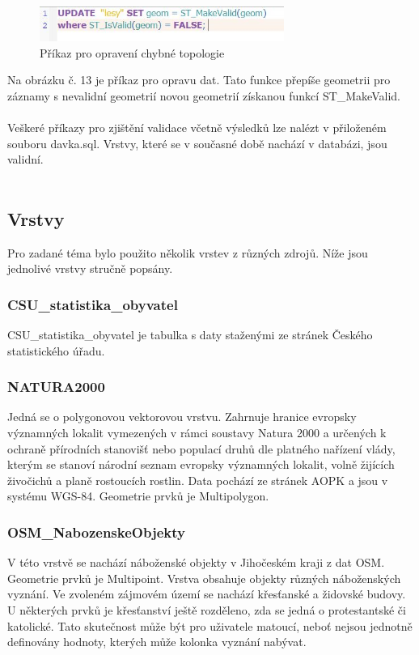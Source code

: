 \documentclass[a4paper, 12pt]{article}
\begin{document}
\begin{figure}[h!]
	\centering
	\includegraphics[width=8cm]{pictures/oprava_val.jpg}
	\caption{Příkaz pro opravení chybné topologie}
\end{figure}

Na obrázku č. 13 je příkaz pro opravu dat. Tato funkce přepíše geometrii pro záznamy s nevalidní geometrií novou geometrií získanou funkcí ST\_MakeValid.\\
\\

Veškeré příkazy pro zjištění validace včetně výsledků lze nalézt v přiloženém souboru davka.sql. Vrstvy, které se v současné době nachází v databázi, jsou validní.\\
\\
\clearpage
\subsection{Vrstvy}
Pro zadané téma bylo použito několik vrstev z různých zdrojů. Níže jsou jednolivé vrstvy stručně popsány.

\subsubsection{CSU\_statistika\_obyvatel}
CSU\_statistika\_obyvatel je tabulka s daty staženými ze stránek Českého statistického úřadu. 

\subsubsection{NATURA2000}
Jedná se o polygonovou vektorovou vrstvu. Zahrnuje hranice evropsky významných lokalit vymezených v rámci soustavy Natura 2000 a určených k ochraně přírodních stanovišť nebo populací druhů dle platného nařízení vlády, kterým se stanoví národní seznam evropsky významných lokalit, volně žijících živočichů a planě rostoucích rostlin. Data pochází ze stránek AOPK a jsou v systému WGS-84. Geometrie prvků je Multipolygon.

\subsubsection{OSM\_NabozenskeObjekty}
V této vrstvě se nachází náboženské objekty v Jihočeském kraji z dat OSM. Geometrie prvků je Multipoint. Vrstva obsahuje objekty různých náboženských vyznání. Ve zvoleném zájmovém území se nachází křesťanské a židovské budovy. U některých prvků je křesťanství ještě rozděleno, zda se jedná o protestantské či katolické. Tato skutečnost může být pro uživatele matoucí, neboť nejsou jednotně definovány hodnoty, kterých může kolonka vyznání nabývat.
\end{document}
